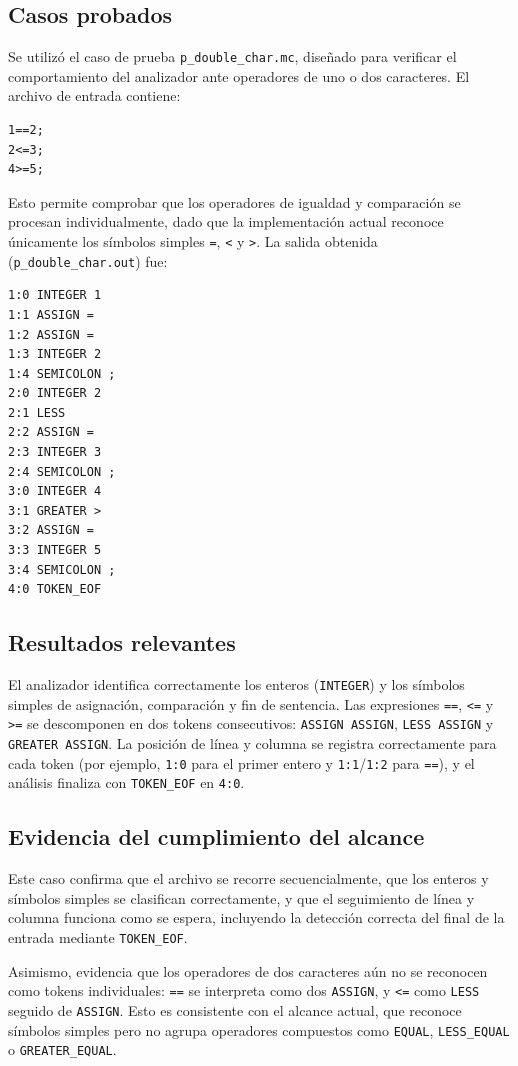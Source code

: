 \documentclass[12pt,letterpaper]{article}
\begin{document}
\subsection*{Casos probados}
Se utilizó el caso de prueba \texttt{p\_double\_char.mc}, diseñado para verificar el comportamiento del analizador ante operadores de uno o dos caracteres. El archivo de entrada contiene:
\begin{verbatim}
1==2;
2<=3;
4>=5;
\end{verbatim}
Esto permite comprobar que los operadores de igualdad y comparación se procesan individualmente, dado que la implementación actual reconoce únicamente los símbolos simples \texttt{=}, \texttt{<} y \texttt{>}. La salida obtenida (\texttt{p\_double\_char.out}) fue:
\begin{verbatim}
1:0 INTEGER 1
1:1 ASSIGN =
1:2 ASSIGN =
1:3 INTEGER 2
1:4 SEMICOLON ;
2:0 INTEGER 2
2:1 LESS
2:2 ASSIGN =
2:3 INTEGER 3
2:4 SEMICOLON ;
3:0 INTEGER 4
3:1 GREATER >
3:2 ASSIGN =
3:3 INTEGER 5
3:4 SEMICOLON ;
4:0 TOKEN_EOF
\end{verbatim}

\subsection*{Resultados relevantes}
El analizador identifica correctamente los enteros (\texttt{INTEGER}) y los símbolos simples de asignación, comparación y fin de sentencia. Las expresiones \texttt{==}, \texttt{<=} y \texttt{>=} se descomponen en dos tokens consecutivos: \texttt{ASSIGN ASSIGN}, \texttt{LESS ASSIGN} y \texttt{GREATER ASSIGN}. La posición de línea y columna se registra correctamente para cada token (por ejemplo, \texttt{1:0} para el primer entero y \texttt{1:1}/\texttt{1:2} para \texttt{==}), y el análisis finaliza con \texttt{TOKEN\_EOF} en \texttt{4:0}.

\subsection*{Evidencia del cumplimiento del alcance}
Este caso confirma que el archivo se recorre secuencialmente, que los enteros y símbolos simples se clasifican correctamente, y que el seguimiento de línea y columna funciona como se espera, incluyendo la detección correcta del final de la entrada mediante \texttt{TOKEN\_EOF}.

Asimismo, evidencia que los operadores de dos caracteres aún no se reconocen como tokens individuales: \texttt{==} se interpreta como dos \texttt{ASSIGN}, y \texttt{<=} como \texttt{LESS} seguido de \texttt{ASSIGN}. Esto es consistente con el alcance actual, que reconoce símbolos simples pero no agrupa operadores compuestos como \texttt{EQUAL}, \texttt{LESS\_EQUAL} o \texttt{GREATER\_EQUAL}.
\end{document}
